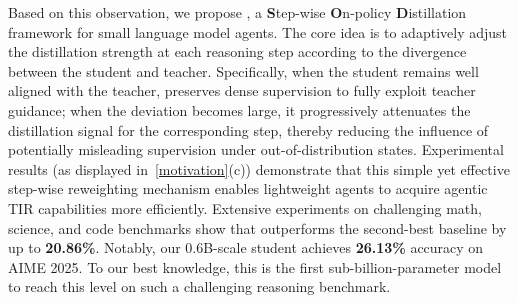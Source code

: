 Based on this observation, we propose \textbf{\ourmodel}, a 
\textbf{S}tep-wise \textbf{O}n-policy \textbf{D}istillation framework for small language model agents. The core idea is to adaptively adjust the distillation strength at each reasoning step according to the divergence between the student and teacher. Specifically, when the student remains well aligned with the teacher, \ourmodel preserves dense supervision to fully exploit teacher guidance; when the deviation becomes large, it progressively attenuates the distillation signal for the corresponding step, thereby reducing the influence of potentially misleading supervision under out-of-distribution states. 
Experimental results (as displayed in~\cref{motivation}(c)) demonstrate that this simple yet effective step-wise reweighting mechanism enables lightweight agents to acquire agentic TIR capabilities more efficiently. 
Extensive experiments on challenging math, science, and code benchmarks show that \ourmodel outperforms the second-best baseline by up to \textbf{20.86\%}.
Notably, our 0.6B-scale student achieves \textbf{26.13\%} accuracy on AIME 2025. To our best knowledge, this is the first sub-billion-parameter model to reach this level on such a challenging reasoning benchmark.










